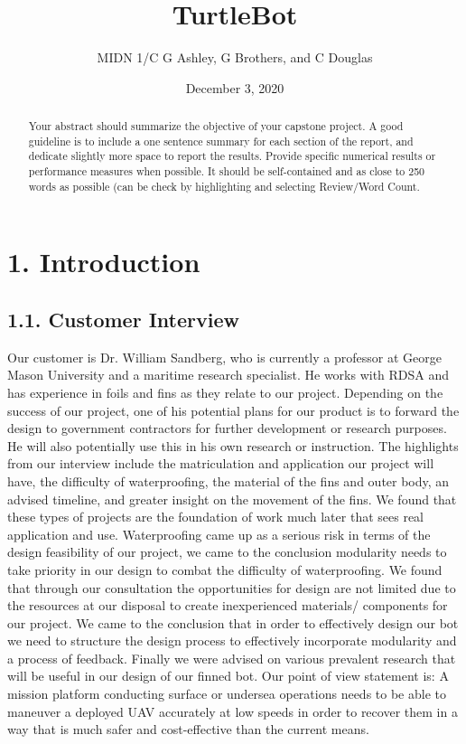 \documentclass[10pt]{article}
\title{TurtleBot}
\author{MIDN 1/C G Ashley, G Brothers, and C Douglas}
\date{December 3, 2020}
\begin{document}
\maketitle

\begin{abstract}
Your abstract should summarize the objective of your capstone project.  A good guideline is to include a one sentence summary for each section of the report, and dedicate slightly more space to report the results.  Provide specific numerical results or performance measures when possible.  It should be self-contained and as close to 250 words as possible (can be check by highlighting and selecting Review/Word Count. 
\end{abstract}


\section{1. Introduction}

\subsection{1.1. Customer Interview}
Our customer is Dr. William Sandberg, who is currently a professor at George Mason University and a maritime research specialist. He works with RDSA and has experience in foils and fins as they relate to our project. Depending on the success of our project, one of his potential plans for our product is to forward the design to government contractors for further development or research purposes. He will also potentially use this in his own research or instruction. The highlights from our interview include the matriculation and application our project will have, the difficulty of waterproofing, the material of the fins and outer body, an advised timeline, and greater insight on the movement of the fins. We found that these types of projects are the foundation of work much later that sees real application and use. Waterproofing came up as a serious risk in terms of the design feasibility of our project, we came to the conclusion modularity needs to take priority in our design to combat the difficulty of waterproofing. We found that through our consultation the opportunities for design are not limited due to the resources at our disposal to create inexperienced materials/ components for our project. We came to the conclusion that in order to effectively design our bot we need to structure the design process to effectively incorporate modularity and a process of feedback. Finally we were advised on various prevalent research that will be useful in our design of our finned bot. Our point of view statement is: A mission platform conducting surface or undersea operations needs to be able to maneuver a deployed UAV accurately at low speeds in order to recover them in a way that is much safer and cost-effective than the current means. 
\end{document}
